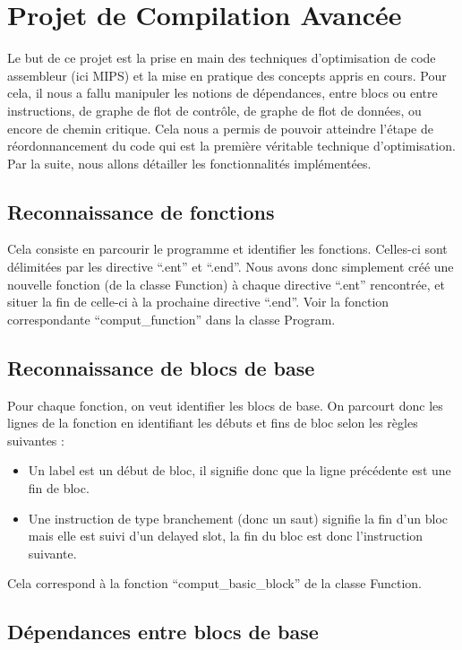 \documentclass[a4paper, 11pt]{report}
\begin{document}
\chapter{Projet de Compilation Avancée}

Le but de ce projet est la prise en main des techniques d'optimisation de code assembleur (ici MIPS) et la mise en pratique des concepts appris en cours. Pour cela, il nous a fallu manipuler les notions de dépendances, entre blocs ou entre instructions, de graphe de flot de contrôle, de graphe de flot de données, ou encore de chemin critique. Cela nous a permis de pouvoir atteindre l'étape de réordonnancement du code qui est la première véritable technique d'optimisation. Par la suite, nous allons détailler les fonctionnalités implémentées.

\section{Reconnaissance de fonctions}

Cela consiste en parcourir le programme et identifier les fonctions. Celles-ci sont délimitées par les directive ``.ent'' et ``.end''. Nous avons donc simplement créé une nouvelle fonction (de la classe Function) à chaque directive ``.ent'' rencontrée, et situer la fin de celle-ci à la prochaine directive ``.end''. Voir la fonction correspondante ``comput\_function'' dans la classe Program.

\section{Reconnaissance de blocs de base}

Pour chaque fonction, on veut identifier les blocs de base. On parcourt donc les lignes de la fonction en identifiant les débuts et fins de bloc selon les règles suivantes :

\begin{itemize}
\item Un label est un début de bloc, il signifie donc que la ligne précédente est une fin de bloc.
\item Une instruction de type branchement (donc un saut) signifie la fin d'un bloc mais elle est suivi d'un delayed slot, la fin du bloc est donc l'instruction suivante.
\end{itemize}

Cela correspond à la fonction ``comput\_basic\_block'' de la classe Function.

\section{Dépendances entre blocs de base}
\end{document}
